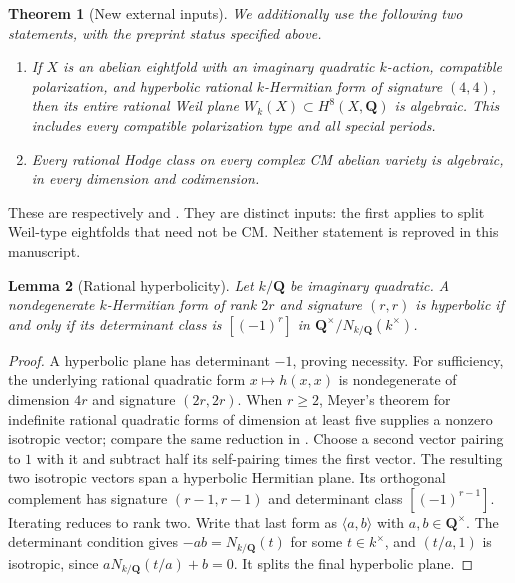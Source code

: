 \documentclass[10pt,reqno]{article}
\theoremstyle{emphasizedplain}
\theoremstyle{emphasizeddefinition}
\theoremstyle{emphasizeddefinition}
\newtheorem{prelemma}{Lemma}
\newtheorem{pretheorem}[prelemma]{Theorem}
\newcommand{\Q}{\mathbf Q}
\begin{document}
\begin{pretheorem}[New external inputs]\label{p:openai-inputs}
We additionally use the following two statements, with the preprint
status specified above.
\begin{enumerate}
\item If $X$ is an abelian eightfold with an imaginary quadratic
$k$-action, compatible polarization, and hyperbolic rational
$k$-Hermitian form of signature $(4,4)$, then its entire rational
Weil plane $W_k(X)\subset H^8(X,\Q)$ is algebraic. This includes
every compatible polarization type and all special periods.
\item Every rational Hodge class on every complex CM abelian variety
is algebraic, in every dimension and codimension.
\end{enumerate}
\end{pretheorem}
These are respectively \cite[Theorem 1.1]{OpenAIEightfold} and
\cite[Theorem 1.1]{OpenAICM}. They are distinct inputs: the first
applies to split Weil-type eightfolds that need not be CM. Neither
statement is reproved in this manuscript.

\begin{prelemma}[Rational hyperbolicity]\label{p:hyperbolic-test}
Let $k/\Q$ be imaginary quadratic. A nondegenerate $k$-Hermitian
form of rank $2r$ and signature $(r,r)$ is hyperbolic if and only if
its determinant class is $[(-1)^r]$ in
$\Q^\times/N_{k/\Q}(k^\times)$.
\end{prelemma}
\begin{proof}
A hyperbolic plane has determinant $-1$, proving necessity.
For sufficiency, the underlying rational quadratic form $x\mapsto h(x,x)$
is nondegenerate of dimension $4r$ and signature $(2r,2r)$.
When $r\geq2$, Meyer's theorem for indefinite rational quadratic
forms of dimension at least five supplies a nonzero isotropic vector;
compare the same reduction in \cite[Lemma 3.2]{OpenAIWeilPowers}.
Choose a second vector pairing to $1$ with it and subtract half its
self-pairing times the first vector. The resulting two isotropic
vectors span a hyperbolic Hermitian plane. Its orthogonal complement
has signature $(r-1,r-1)$ and determinant class $[(-1)^{r-1}]$.
Iterating reduces to rank two. Write that last form as
$\langle a,b\rangle$ with $a,b\in\Q^\times$.
The determinant condition gives $-ab=N_{k/\Q}(t)$ for some
$t\in k^\times$, and $(t/a,1)$ is isotropic, since
$aN_{k/\Q}(t/a)+b=0$. It splits the final hyperbolic plane.
\end{proof}
\end{document}
